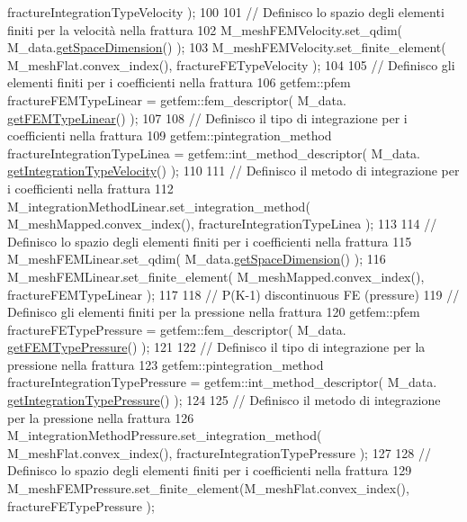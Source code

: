 \begin{DoxyCode}
      fractureIntegrationTypeVelocity );
100     
101     \textcolor{comment}{// Definisco lo spazio degli elementi finiti per la velocità nella frattura}
102     M\_meshFEMVelocity.set\_qdim( M\_data.\hyperlink{classFractureData_a4ead03266295fe14fa3285692f945d89}{getSpaceDimension}() );
103     M\_meshFEMVelocity.set\_finite\_element( M\_meshFlat.convex\_index(), fractureFETypeVelocity );
104 
105     \textcolor{comment}{// Definisco gli elementi finiti per i coefficienti nella frattura}
106     getfem::pfem fractureFEMTypeLinear = getfem::fem\_descriptor( M\_data.
      \hyperlink{classFractureData_a606c22e054fdb5f8602ce39fa6ae15cc}{getFEMTypeLinear}() );
107 
108     \textcolor{comment}{// Definisco il tipo di integrazione per i coefficienti nella frattura}
109     getfem::pintegration\_method fractureIntegrationTypeLinea = getfem::int\_method\_descriptor( M\_data.
      \hyperlink{classFractureData_a8a8a198482de6bf4104746bc1d0510c6}{getIntegrationTypeVelocity}() );
110 
111     \textcolor{comment}{// Definisco il metodo di integrazione per i coefficienti nella frattura}
112     M\_integrationMethodLinear.set\_integration\_method( M\_meshMapped.convex\_index(), 
      fractureIntegrationTypeLinea );
113 
114     \textcolor{comment}{// Definisco lo spazio degli elementi finiti per i coefficienti nella frattura}
115     M\_meshFEMLinear.set\_qdim( M\_data.\hyperlink{classFractureData_a4ead03266295fe14fa3285692f945d89}{getSpaceDimension}() );
116     M\_meshFEMLinear.set\_finite\_element( M\_meshMapped.convex\_index(), fractureFEMTypeLinear );
117 
118     \textcolor{comment}{// P(K-1) discontinuous FE (pressure)}
119     \textcolor{comment}{// Definisco gli elementi finiti per la pressione nella frattura}
120     getfem::pfem fractureFETypePressure = getfem::fem\_descriptor( M\_data.
      \hyperlink{classFractureData_a643b9a8a33405ec7aaa6b5612cb81d57}{getFEMTypePressure}() );
121 
122     \textcolor{comment}{// Definisco il tipo di integrazione per la pressione nella frattura}
123     getfem::pintegration\_method fractureIntegrationTypePressure = getfem::int\_method\_descriptor( M\_data.
      \hyperlink{classFractureData_a9333d8e89dc92023d97a48c1905ada76}{getIntegrationTypePressure}() );
124 
125     \textcolor{comment}{// Definisco il metodo di integrazione per la pressione nella frattura}
126     M\_integrationMethodPressure.set\_integration\_method( M\_meshFlat.convex\_index(), 
      fractureIntegrationTypePressure );
127 
128     \textcolor{comment}{// Definisco lo spazio degli elementi finiti per i coefficienti nella frattura}
129     M\_meshFEMPressure.set\_finite\_element(M\_meshFlat.convex\_index(), fractureFETypePressure );

\end{DoxyCode}

